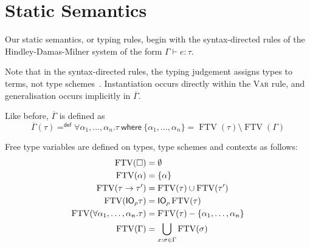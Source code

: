 \section{Static Semantics}

Our static semantics, or typing rules, begin with the syntax-directed
rules of the Hindley-Damas-Milner system of the form $\Gamma \vdash e : \tau$.


Note that in the syntax-directed rules, the typing judgement assigns
types to terms, not type schemes~\cite[p.15]{tofte1988}. Instantiation occurs
directly within the \textsc{Var} rule, and generalisation occurs
implicitly in $\overline{\Gamma}$.

\newcommand{\ftv}{\operatorname{FTV}}
\newcommand{\fv}{\operatorname{FV}}

Like before, $\overline{\Gamma}$ is defined as
$$ \overline{\Gamma}(\tau) =^{\textsf{def}} \forall \alpha_1, \ldots, \alpha_n . \tau \
\textsf{where} \ \{ \alpha_1, \ldots, \alpha_n \} = \ftv(\tau) \setminus \ftv(\Gamma)$$

Free type variables are defined on types, type schemes and contexts as
follows:
\begin{align*}
  \ftv(\square) &= \emptyset \\
  \ftv(\alpha) &= \{ \alpha \} \\
  \ftv(\tau \rightarrow \tau') &= \ftv(\tau) \cup \ftv(\tau') \\
  \ftv(\IO_\rho \tau) &= \IO_\rho \ftv(\tau) \\
  \ftv(\forall \alpha_1 , \ldots , \alpha_n . \tau) &= \ftv(\tau) - \{ \alpha_1 , \ldots, \alpha_n \} \\
  \ftv(\Gamma) &= \bigcup_{x : \sigma \in \Gamma} \ftv(\sigma)
\end{align*}

